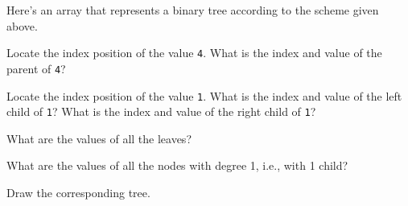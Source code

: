 Here's an array that represents a binary tree according to the
scheme given above.



\begin{tightlist}
  \item Locate the index position of the value \texttt{4}.
  What is the index and value of the parent of \texttt{4}?                                              
  \item Locate the index position of the value \texttt{1}.
  What is the index and value of the left child of \texttt{1}?
  What is the index and value of the right child of \texttt{1}?
  \item What are the values of all the leaves?
  \item What are the values of all the nodes with degree 1, i.e., with 1
  child?
  \item Draw the corresponding tree.
\end{tightlist}                                    

